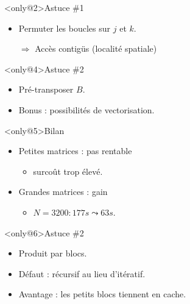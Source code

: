 \documentclass[xcolor={x11names,svgnames}, 14pt]{beamer}
\begin{document}
\begin{frame}[label=applications,fragile]
\begin{overlayarea}{\textwidth}{4cm}
\begin{onlyenv}
\end{onlyenv}

\begin{block}<only@2>{Astuce \#1}
\begin{itemize}
\item Permuter les boucles sur $j$ et $k$.
\item[$\Rightarrow$] Accès contigüs (localité spatiale)
\end{itemize}
\end{block}


\begin{block}<only@4>{Astuce \#2}
\begin{itemize}
\item Pré-transposer $B$.
  
\item Bonus : possibilités de vectorisation.
\end{itemize}
\end{block}

\begin{exampleblock}<only@5>{Bilan}
  \begin{itemize}    
  \item Petites matrices : pas rentable
    \begin{itemize}
    \item surcoût trop élevé.
    \end{itemize}

  \item Grandes matrices : gain
    \begin{itemize}
    \item $N=3200 : 177s \leadsto 63s$.
    \end{itemize}
  \end{itemize}
\end{exampleblock}

\begin{block}<only@6>{Astuce \#2}
  \begin{itemize}
  \item Produit par blocs.
  
  \item Défaut : récursif au lieu d'itératif.

  \item Avantage : les petits blocs tiennent en cache.
  \end{itemize}
\end{block}


\end{overlayarea}

\end{frame}
\end{document}
